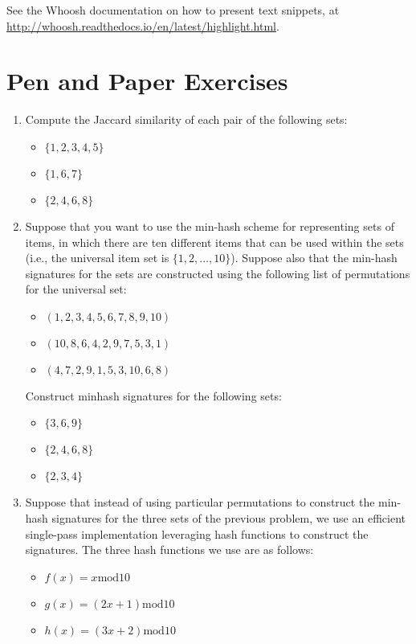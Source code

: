 \documentclass[12pt]{article}
\begin{document}
See the Whoosh documentation on how to present text snippets, at
\url{http://whoosh.readthedocs.io/en/latest/highlight.html}.

\section{Pen and Paper Exercises}

\begin{enumerate}
\item Compute the Jaccard similarity of each pair of the following sets: 

\begin{itemize}
\item $\{1, 2, 3, 4, 5\}$
\item $\{1, 6, 7\}$
\item $\{2, 4, 6, 8\}$
\end{itemize}

\item Suppose that you want to use the min-hash scheme for representing sets of items, in which there are ten different items that can be used within the sets (i.e., the universal item set is $\{ 1, 2, \ldots , 10\}$). Suppose also that the min-hash signatures for the sets are constructed using the following list of permutations for the universal set:

\begin{itemize}
\item $(1,2,3,4,5,6,7,8,9,10)$ 
\item $(10,8,6,4,2,9,7,5,3,1)$ 
\item $(4,7,2,9,1,5,3,10,6,8)$
\end{itemize}

Construct minhash signatures for the following sets: 

\begin{itemize}
\item $\{3,6,9\}$
\item $\{2,4,6,8\}$
\item $\{2,3,4\}$
\end{itemize}

\item Suppose that instead of using particular permutations to construct the min-hash signatures for the three sets of the previous problem, we use an efficient single-pass implementation leveraging hash functions to construct the signatures. The three hash functions we use are as follows:

\begin{itemize}
\item $f(x)=x \mathrm{mod} 10 $
\item $g(x)=(2x+1) \mathrm{mod} 10$
\item $h(x)=(3x+2) \mathrm{mod} 10$
\end{itemize}


\end{enumerate}
\end{document}
